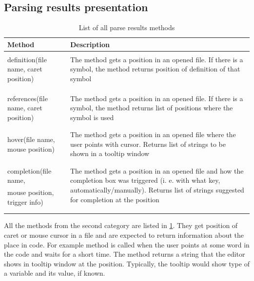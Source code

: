 \subsection{Parsing results presentation}

\begin{table}
	\centering
	\begin{tabular}{ll}
		
		\toprule
		Method & Description \\ \midrule
		& \multirow{3}{8cm}{The method gets a position in an opened file. If there is a symbol, the method returns position of definition of that symbol} \\
		definition(file name, caret position) &  \\
		& \\
		& \\
		& \multirow{3}{8cm}{The method gets a position in an opened file. If there is a symbol, the method returns list of positions where the symbol is used}\\
		references(file name, caret position) & \\
		& \\
		& \\
		& \multirow{3}{8cm}{The method gets a position in an opened file where the user points with cursor. Returns list of strings to be shown in a tooltip window}\\
		hover(file name, mouse position)& \\
		& \\
		& \\
		& \multirow{3}{8cm}{The method gets a position in an opened file and how the completion box was triggered (i. e. with what key, automatically/manually). Returns list of strings suggested for completion at the position}\\
		completion(file name,& \\
		mouse position, trigger info)& \\
		& \\
		& \\ \bottomrule
	\end{tabular}
	
	\caption{List of all parse results methods}
	\label{parse_results}
\end{table}

All the methods from the second category are listed in \cref{parse_results}. They get position of caret or mouse cursor in a file and are expected to return information about the place in code. For example method  is called when the user points at some word in the code and waits for a short time. The method returns a string that the editor shows in tooltip window at the position. Typically, the tooltip would show type of a variable and its value, if known.

